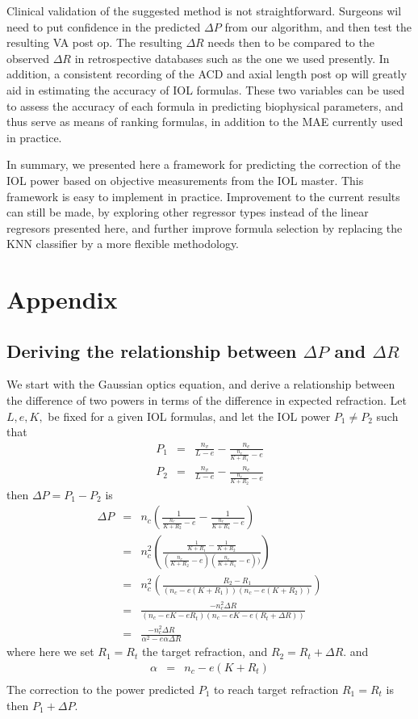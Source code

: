 \documentclass[article,twocolumn,preprint,10pt]{paper}%
\renewcommand{\(}{\left(}
\renewcommand{\)}{\right)}
\renewcommand{\[}{\left[}
\renewcommand{\]}{\right]}
\newcommand{\beq}{\begin{eqnarray}}
\newcommand{\eeq}{\end{eqnarray}}
\newcommand{\1}{\mbox{\boldmath$1$}}
\begin{document}
Clinical validation of the suggested method is not straightforward. Surgeons wil need to put confidence in the predicted $\Delta P$ from our algorithm, and then test the resulting VA post op. The resulting $\Delta R$ needs then to be compared to the observed $\Delta R $ in retrospective databases such as the one we used presently. 
In addition, a consistent recording of the ACD and axial length post op will greatly aid in estimating the accuracy of IOL formulas. These two variables can be used to assess the accuracy of each formula in predicting biophysical parameters, and thus serve as means of ranking formulas, in addition to the MAE currently used in practice. 

In summary, we presented here a framework for predicting the correction of the IOL power based on objective measurements from the IOL master. This framework is easy to implement in practice. Improvement to the current results can still be made, by exploring other regressor types instead of the linear regresors presented here, and further improve formula selection by replacing the KNN classifier by a more flexible methodology.


\section{Appendix}\label{section:iolFormulas}
\subsection{Deriving the relationship between $\Delta P$ and $\Delta R$}\label{subsection:derivationOfdPTodR}
We start with the Gaussian optics equation, and derive a relationship between the difference of two powers in terms of the difference in expected refraction. 
Let $L,e, K,$ be fixed for a given IOL formulas, and let the IOL power $P_1\neq P_2$ such that 
\beq
P_1 &=& \frac{n_v}{L-e}-\frac{n_c}{\frac{n_c}{K+R_1}-e}\\
P_2 &=& \frac{n_v}{L-e}-\frac{n_c}{\frac{n_c}{K+R_2}-e}
\eeq 
then 
$\Delta P = P_1-P_2$ is 
\beq 
\Delta P &=& n_c\left( \frac{1}{\frac{n_c}{K+R_2}-e}- \frac{1}{\frac{n_c}{K+R_1}-e}\right)\nonumber\\
 &=& n_c^2 \left(\frac{\frac{1}{K+R_1}-\frac{1}{K+R_2}}{ \left(\frac{n_c}{K+R_2}-e\right)\left(\frac{n_c}{K+R_1}-e\right) )}\right)\nonumber\\
  &=& n_c^2\left(\frac{R_2-R_1}{(n_c-e(K+R_1))(n_c-e(K+R_2))} \right)\nonumber \\
  &=&  \frac{-n_c^2\Delta R}{(n_c-eK-eR_t)(n_c-eK-e(R_t+\Delta R))} \nonumber \\
  &=& \frac{-n_c^2\Delta R}{\alpha^2 -e\alpha \Delta R} \label{eq:deriveddPtodR}
\eeq 
where here we set $R_1=R_t$ the target refraction, and $R_2=R_t+\Delta R$.
and 
\beq 
\alpha &=& n_c-e(K+R_t)\nonumber \\
\eeq 
The correction to the power predicted $P_1$ to reach target refraction $R_1=R_t$ is then $P_1+\Delta P$. 
\end{document}
